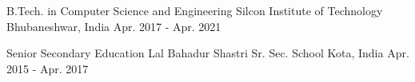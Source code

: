 

\begin{cventries}

  \cventry
    {B.Tech. in Computer Science and Engineering} %
    {Silcon Institute of Technology} %
    {Bhubaneshwar, India} %
    {Apr. 2017 - Apr. 2021} %
    {}

  \cventry
    {Senior Secondary Education} %
    {Lal Bahadur Shastri Sr. Sec. School} %
    {Kota, India} %
    {Apr. 2015 - Apr. 2017} %
    {}

\end{cventries}
